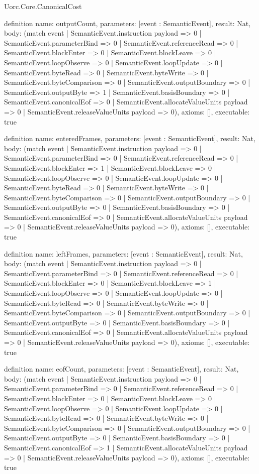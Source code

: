 \begin{lexlean}{Uorc.Core.CanonicalCost}
\begin{semanticmodule}
definition{
  name: outputCount,
  parameters: [event : SemanticEvent],
  result: Nat,
  body: (match event
    | SemanticEvent.instruction payload => 0
    | SemanticEvent.parameterBind => 0
    | SemanticEvent.referenceRead => 0
    | SemanticEvent.blockEnter => 0
    | SemanticEvent.blockLeave => 0
    | SemanticEvent.loopObserve => 0
    | SemanticEvent.loopUpdate => 0
    | SemanticEvent.byteRead => 0
    | SemanticEvent.byteWrite => 0
    | SemanticEvent.byteComparison => 0
    | SemanticEvent.outputBoundary => 0
    | SemanticEvent.outputByte => 1
    | SemanticEvent.basisBoundary => 0
    | SemanticEvent.canonicalEof => 0
    | SemanticEvent.allocateValueUnits payload => 0
    | SemanticEvent.releaseValueUnits payload => 0),
  axioms: [],
  executable: true
}

definition{
  name: enteredFrames,
  parameters: [event : SemanticEvent],
  result: Nat,
  body: (match event
    | SemanticEvent.instruction payload => 0
    | SemanticEvent.parameterBind => 0
    | SemanticEvent.referenceRead => 0
    | SemanticEvent.blockEnter => 1
    | SemanticEvent.blockLeave => 0
    | SemanticEvent.loopObserve => 0
    | SemanticEvent.loopUpdate => 0
    | SemanticEvent.byteRead => 0
    | SemanticEvent.byteWrite => 0
    | SemanticEvent.byteComparison => 0
    | SemanticEvent.outputBoundary => 0
    | SemanticEvent.outputByte => 0
    | SemanticEvent.basisBoundary => 0
    | SemanticEvent.canonicalEof => 0
    | SemanticEvent.allocateValueUnits payload => 0
    | SemanticEvent.releaseValueUnits payload => 0),
  axioms: [],
  executable: true
}

definition{
  name: leftFrames,
  parameters: [event : SemanticEvent],
  result: Nat,
  body: (match event
    | SemanticEvent.instruction payload => 0
    | SemanticEvent.parameterBind => 0
    | SemanticEvent.referenceRead => 0
    | SemanticEvent.blockEnter => 0
    | SemanticEvent.blockLeave => 1
    | SemanticEvent.loopObserve => 0
    | SemanticEvent.loopUpdate => 0
    | SemanticEvent.byteRead => 0
    | SemanticEvent.byteWrite => 0
    | SemanticEvent.byteComparison => 0
    | SemanticEvent.outputBoundary => 0
    | SemanticEvent.outputByte => 0
    | SemanticEvent.basisBoundary => 0
    | SemanticEvent.canonicalEof => 0
    | SemanticEvent.allocateValueUnits payload => 0
    | SemanticEvent.releaseValueUnits payload => 0),
  axioms: [],
  executable: true
}

definition{
  name: eofCount,
  parameters: [event : SemanticEvent],
  result: Nat,
  body: (match event
    | SemanticEvent.instruction payload => 0
    | SemanticEvent.parameterBind => 0
    | SemanticEvent.referenceRead => 0
    | SemanticEvent.blockEnter => 0
    | SemanticEvent.blockLeave => 0
    | SemanticEvent.loopObserve => 0
    | SemanticEvent.loopUpdate => 0
    | SemanticEvent.byteRead => 0
    | SemanticEvent.byteWrite => 0
    | SemanticEvent.byteComparison => 0
    | SemanticEvent.outputBoundary => 0
    | SemanticEvent.outputByte => 0
    | SemanticEvent.basisBoundary => 0
    | SemanticEvent.canonicalEof => 1
    | SemanticEvent.allocateValueUnits payload => 0
    | SemanticEvent.releaseValueUnits payload => 0),
  axioms: [],
  executable: true
}


\end{semanticmodule}
\end{lexlean}
